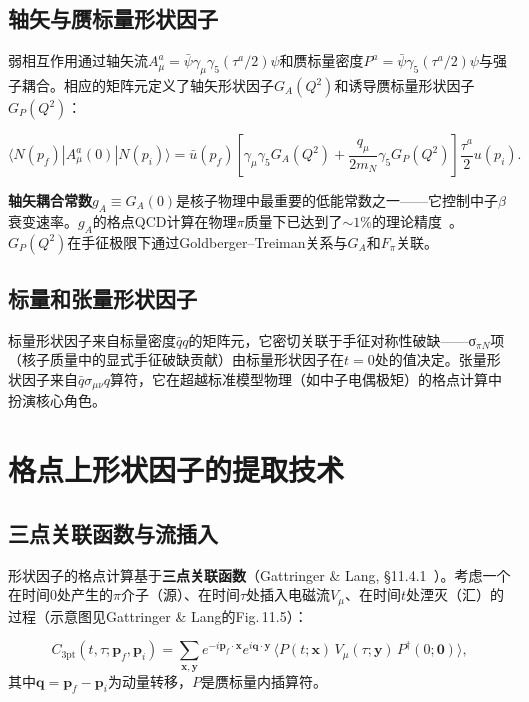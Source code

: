 \documentclass[12pt,a4paper]{ctexart}
\theoremstyle{definition}
\begin{document}
\subsection{轴矢与赝标量形状因子}

弱相互作用通过轴矢流$A_\mu^a = \bar\psi \gamma_\mu\gamma_5 (\tau^a/2) \psi$和赝标量密度$P^a = \bar\psi \gamma_5 (\tau^a/2) \psi$与强子耦合。相应的矩阵元定义了轴矢形状因子$G_A(Q^2)$和诱导赝标量形状因子$G_P(Q^2)$：

\begin{equation}
\langle N(p_f) | A_\mu^a(0) | N(p_i) \rangle = \bar u(p_f) \left[ \gamma_\mu\gamma_5 G_A(Q^2) + \frac{q_\mu}{2m_N}\gamma_5 G_P(Q^2) \right] \frac{\tau^a}{2} u(p_i).
\label{eq:axial_FF}
\end{equation}

\textbf{轴矢耦合常数}$g_A \equiv G_A(0)$是核子物理中最重要的低能常数之一——它控制中子$\beta$衰变速率。$g_A$的格点QCD计算在物理$\pi$质量下已达到了$\sim 1\%$的理论精度~\cite{GattringerLang2010}。$G_P(Q^2)$在手征极限下通过Goldberger--Treiman关系与$G_A$和$F_\pi$关联。

\subsection{标量和张量形状因子}

标量形状因子来自标量密度$\bar q q$的矩阵元，它密切关联于手征对称性破缺——σ$_{\pi N}$项（核子质量中的显式手征破缺贡献）由标量形状因子在$t=0$处的值决定。张量形状因子来自$\bar q \sigma_{\mu\nu} q$算符，它在超越标准模型物理（如中子电偶极矩）的格点计算中扮演核心角色。

\section{格点上形状因子的提取技术}

\subsection{三点关联函数与流插入}

形状因子的格点计算基于\textbf{三点关联函数}（Gattringer \& Lang, §11.4.1~\cite{GattringerLang2010}）。考虑一个在时间$0$处产生的$\pi$介子（源）、在时间$\tau$处插入电磁流$V_\mu$、在时间$t$处湮灭（汇）的过程（示意图见Gattringer \& Lang的Fig.\,11.5）：

\begin{equation}
C_{3\text{pt}}(t, \tau; \mathbf{p}_f, \mathbf{p}_i) = \sum_{\mathbf{x}, \mathbf{y}} e^{-i\mathbf{p}_f\cdot\mathbf{x}} e^{i\mathbf{q}\cdot\mathbf{y}} \,
\big\langle P(t; \mathbf{x}) \, V_\mu(\tau; \mathbf{y}) \, P^\dagger(0; \mathbf{0}) \big\rangle,
\label{eq:three_pt}
\end{equation}
其中$\mathbf{q} = \mathbf{p}_f - \mathbf{p}_i$为动量转移，$P$是赝标量内插算符。
\end{document}
